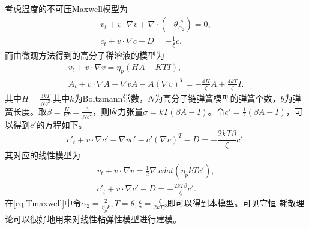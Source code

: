 \documentclass{article}
\begin{document}
	考虑温度的不可压Maxwell模型为
	\begin{eqnarray} \label{eq:Tmaxwell}
		v_t + v \cdot \nabla v + \nabla \cdot (-\theta \frac{c}{\alpha_2}) = 0, \\
		c_t + v \cdot \nabla c - D = -\frac{1}{\xi} c.
	\end{eqnarray}
	而由微观方法得到的高分子稀溶液的模型为 \cite{}
	\begin{eqnarray*}
		v_t + v \cdot \nabla v = \eta_p (H A - KT I), \\
		A_t + v \cdot \nabla A - \nabla v A - A(\nabla v)^T  = -\frac{4 H}{\zeta} A+ \frac{4kT}{\zeta} I.
	\end{eqnarray*}
	其中$H = \frac{3kT}{Nb^2}$.其中$k$为Boltzmann常数，$N$为高分子链弹簧模型的弹簧个数，$b$为弹簧长度。取$\beta = \frac{H}{kT} = \frac{3}{Nb^2}$，则应力张量$\sigma = k T(\beta A-I)$。令$c'=\frac{1}{2}(\beta A-I)$，可以得到$c'$的方程如下。
	\begin{equation}\label{eq:MicroUCM}
		c'_t + v \cdot \nabla c'- \nabla v c' - c'(\nabla v)^T -  D  = -\frac{2 kT \beta}{\zeta} c'.
	\end{equation}
	其对应的线性模型为
	\begin{eqnarray*}
		v_t + v \cdot \nabla v = \frac{1}{2} \nabla\ cdot (\eta_p kT c'), \\
		c'_t + v \cdot \nabla c' -  D  = -\frac{2 kT \beta}{\zeta} c'.
	\end{eqnarray*}
	在\eqref{eq:Tmaxwell}中令$\alpha_2 = \frac{2}{\eta_p k}, T = \theta,\xi = \frac{\zeta}{2 kT \beta}$即可以得到本模型。可见守恒-耗散理论可以很好地用来对线性粘弹性模型进行建模。
\end{document}
